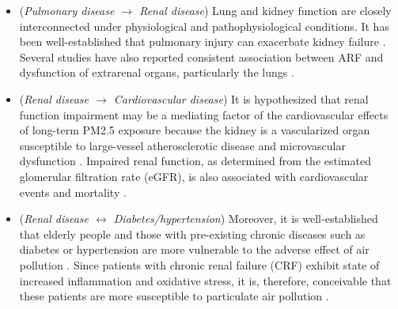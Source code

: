 \documentclass[11pt]{article}
\begin{document}
\begin{itemize}
    \item (\textit{Pulmonary disease $\rightarrow$ Renal disease}) Lung and kidney function are closely interconnected under physiological and pathophysiological conditions. It has been well-established that pulmonary injury can exacerbate kidney failure \citep{pierson2006respiratory}. Several studies have also reported consistent association between ARF and dysfunction of extrarenal organs, particularly the lungs \citep{hoke2007acute, pierson2006respiratory}.
    \item (\textit{Renal disease $\rightarrow$ Cardiovascular disease}) It is hypothesized that renal function impairment may be a mediating factor of the cardiovascular effects of long-term PM2.5 exposure because the kidney is a vascularized organ susceptible to large-vessel atherosclerotic disease and microvascular dysfunction \citep{lue2013residential}. Impaired renal function, as determined from the estimated glomerular filtration rate (eGFR), is also associated with cardiovascular events and mortality \citep{fox2012associations, go2004chronic, sarnak2003kidney}. 
    \item (\textit{Renal disease $\leftrightarrow$ Diabetes/hypertension}) Moreover, it is well-established that elderly people and those with pre-existing chronic diseases such as diabetes or hypertension are more vulnerable to the adverse effect of air pollution \citep{brook2010particulate}. Since patients with chronic renal failure (CRF) exhibit state of increased inflammation and oxidative stress, it is, therefore, conceivable that these patients are more susceptible to particulate air pollution \citep{laden2011air, huang2014impact}.
\end{itemize}
\end{document}

